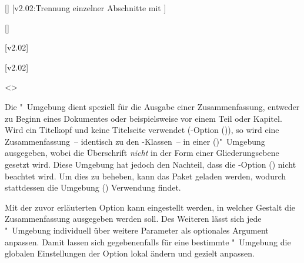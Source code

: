 \begin{DeclareEntity*}{}
\begin{DeclareEntity*}{}
\begin{DeclareEntity*}{}
\begin{Declaration}
  {[]}
  [v2.02:Trennung einzelner Abschnitte mit ]
\begin{Declaration}
  {[]}
\begin{Declaration}
  {}
\begin{Declaration}
  {}
  [v2.02]
\begin{Declaration}
  {}
  [v2.02]
\begin{Declaration}
  {}
\begin{Declaration}
  {}
  <>
\printdeclarationlist

Die "~Umgebung dient speziell für die Ausgabe einer 
Zusammenfassung, entweder zu Beginn eines Dokumentes oder beispielsweise vor 
einem Teil oder Kapitel. Wird ein Titelkopf und keine Titelseite verwendet 
(\KOMAScript-Option ()), so wird 
eine Zusammenfassung~-- identisch zu den \KOMAScript-Klassen~-- in einer 
()"~Umgebung ausgegeben, wobei die 
Überschrift \emph{nicht} in der Form einer Gliederungsebene gesetzt wird. Diese 
Umgebung hat jedoch den Nachteil, dass die \KOMAScript-Option 
() nicht beachtet wird. Um dies zu 
beheben, kann das Paket  geladen werden, wodurch stattdessen 
die Umgebung () Verwendung findet.

Mit der zuvor erläuterten Option  kann eingestellt werden, in 
welcher Gestalt die Zusammenfassung ausgegeben werden soll. Des Weiteren lässt 
sich jede "~Umgebung individuell über weitere Parameter 
als optionales Argument anpassen. Damit lassen sich gegebenenfalls für eine 
bestimmte "~Umgebung die globalen Einstellungen 
der Option  lokal ändern und gezielt anpassen. 


\end{Declaration}
\end{Declaration}
\end{Declaration}
\end{Declaration}
\end{Declaration}
\end{Declaration}
\end{Declaration}
\end{DeclareEntity*}
\end{DeclareEntity*}
\end{DeclareEntity*}
